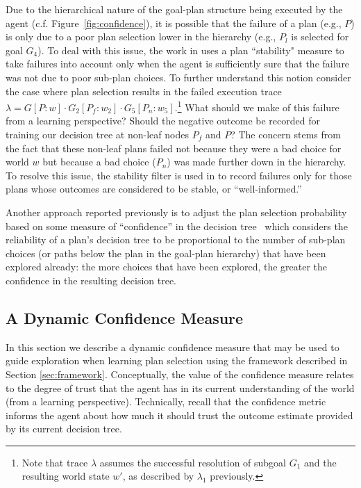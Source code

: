 Due to the hierarchical nature of the goal-plan structure being executed by the agent (c.f. Figure~\ref{fig:confidence}), it is possible that the failure of a plan (e.g., $P$) is only due to a poor plan selection lower in the hierarchy (e.g., $P_l$ is selected for goal $G_4$).
To deal with this issue, the work in \cite{airiau09:enhancing} uses a plan ``stability" measure to take failures into account only when the agent is sufficiently sure that the failure was not due to poor sub-plan choices. 
%
To further understand this notion consider the case where plan selection results in the failed execution trace $\lambda = G[P:w] \cdot G_2[P_f:w_2] \cdot G_5[P_n:w_5]$.\footnote{Note that trace $\lambda$ assumes the successful resolution of subgoal $G_1$ and the resulting world state $w'$, as described by $\lambda_1$ previously.} What should we make of this failure from a learning perspective? Should the negative outcome be recorded for training our decision tree at non-leaf nodes $P_f$ and $P$? The concern stems from the fact that these non-leaf plans failed not because they were a bad choice for world $w$ but because a bad choice ($P_n$) was made further down in the hierarchy. To resolve this issue, the stability filter is used in \cite{airiau09:enhancing} to record failures only for those plans whose outcomes are considered to be stable, or ``well-informed.'' 
%

Another approach reported previously is to adjust the plan selection probability based on some measure of ``confidence'' in the decision tree~\cite{singh10:extending,singh10:learning} which considers the reliability of a plan's decision tree to be proportional to the number of sub-plan choices (or paths below the plan in the goal-plan hierarchy) that have been explored already: the more choices that have been explored, the greater the confidence in the resulting decision tree. 


\subsection{A Dynamic Confidence Measure}\label{sec:confidence}

In this section we describe a dynamic confidence measure that may be used to guide exploration when learning plan selection using the framework described in Section \ref{sec:framework}. Conceptually, the value of the confidence measure relates to the degree of trust that the agent has in its current understanding of the world (from a learning perspective). Technically, recall that the confidence metric informs the agent about how much it should trust the outcome estimate provided by its current decision tree.

